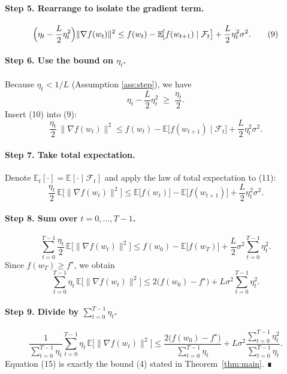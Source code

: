 \documentclass{article}
\newcommand{\EE}{\mathbb{E}}
\begin{document}
\paragraph{Step 5. Rearrange to isolate the gradient term.}
\[
\Bigl(\eta_t-\frac{L}{2}\eta_t^{2}\Bigr)\|\nabla f(w_t)\|^{2}
\le f(w_t)-\EE\!\bigl[f(w_{t+1})\mid\mathcal{F}_t\bigr]
     +\frac{L}{2}\eta_t^{2}\sigma^{2}.
\tag{9}
\]
\paragraph{Step 6. Use the bound on $\eta_t$.}
Because $\eta_t<1/L$ (Assumption \ref{ass:step}), we have
\[
\eta_t-\frac{L}{2}\eta_t^{2}
\;\ge\;\frac{\eta_t}{2}.
\tag{10}
\]
Insert (10) into (9):
\[
\frac{\eta_t}{2}\,\|\nabla f(w_t)\|^{2}
\le f(w_t)-\EE\!\bigl[f(w_{t+1})\mid\mathcal{F}_t\bigr]
     +\frac{L}{2}\eta_t^{2}\sigma^{2}.
\tag{11}
\]
\paragraph{Step 7. Take total expectation.}
Denote $\EE_t[\cdot]=\EE[\cdot\mid\mathcal{F}_t]$ and apply the law of total expectation to (11):
\[
\frac{\eta_t}{2}\,\EE\!\bigl[\|\nabla f(w_t)\|^{2}\bigr]
\le \EE\!\bigl[f(w_t)\bigr]-\EE\!\bigl[f(w_{t+1})\bigr]
     +\frac{L}{2}\eta_t^{2}\sigma^{2}.
\tag{12}
\]
\paragraph{Step 8. Sum over $t=0,\dots,T-1$.}
\[
\sum_{t=0}^{T-1}\frac{\eta_t}{2}\,\EE\!\bigl[\|\nabla f(w_t)\|^{2}\bigr]
\le f(w_0)-\EE\!\bigl[f(w_T)\bigr]
     +\frac{L}{2}\sigma^{2}\sum_{t=0}^{T-1}\eta_t^{2}.
\tag{13}
\]
Since $f(w_T)\ge f^\star$, we obtain
\[
\sum_{t=0}^{T-1}\eta_t\,\EE\!\bigl[\|\nabla f(w_t)\|^{2}\bigr]
\le 2\bigl(f(w_0)-f^\star\bigr)
     +L\sigma^{2}\sum_{t=0}^{T-1}\eta_t^{2}.
\tag{14}
\]
\paragraph{Step 9. Divide by $\sum_{t=0}^{T-1}\eta_t$.}
\[
\frac{1}{\sum_{t=0}^{T-1}\eta_t}
\sum_{t=0}^{T-1}\eta_t\,\EE\!\bigl[\|\nabla f(w_t)\|^{2}\bigr]
\le
\frac{2\bigl(f(w_0)-f^\star\bigr)}{\sum_{t=0}^{T-1}\eta_t}
     +L\sigma^{2}\frac{\sum_{t=0}^{T-1}\eta_t^{2}}{\sum_{t=0}^{T-1}\eta_t}.
\tag{15}
\]
Equation (15) is exactly the bound (4) stated in Theorem~\ref{thm:main}. ∎
\end{document}

